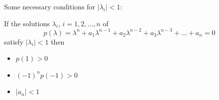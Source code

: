 Some necessary conditions for $|\lambda _i|<1$:
\begin{theorem}
If the solutions $\lambda _i$, $i=1,2,\dots , n$ of $$p(\lambda)=\lambda ^n + a_1 \lambda ^{n-1}+ a_2 \lambda ^{n-2}+a_3 \lambda ^{n-3}+\dots + a_n=0$$
satisfy $|\lambda _i|<1$ then
\begin{itemize}
\item $p(1)>0$
\item $(-1)^np(-1)>0$
\item $|a_n|<1$
\end{itemize}
\end{theorem}



%


